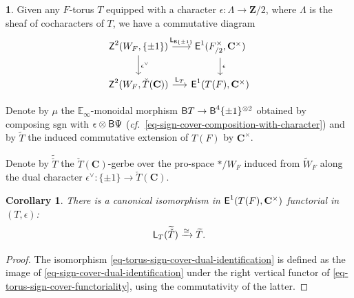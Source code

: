 \documentclass[10pt,english,reqno]{amsart}
\newcommand{\integers}{\mathbf Z}
\newcommand{\complexes}{\mathbf C}
\newcommand{\cycle}{\textnormal{\textsf{Z}}}
\newcommand{\extension}{\textnormal{\textsf{E}}}
\newcommand{\deloop}{\textnormal{\textsf{B}}}
\newcommand{\sgn}{\mathrm{sgn}}
\newcommand{\Langlands}{\textnormal{\textsf{L}}}
\newtheorem{cor}[subsubsection]{Corollary}
\theoremstyle{definition}
\numberwithin{equation}{section}
\newtheorem{untitledsubsubsection}[subsubsection]{}
\newenvironment{void}
{\begin{untitledsubsubsection}}
{\end{untitledsubsubsection}}
\begin{document}

\begin{void}
Given any $F$-torus $T$ equipped with a character $\epsilon : \Lambda \rightarrow \integers/2$, where $\Lambda$ is the sheaf of cocharacters of $T$, we have a commutative diagram
\begin{equation}
\label{eq-torus-sign-cover-functoriality}
\begin{tikzcd}[column sep = 1.5em]
	\cycle^2(W_F, \{\pm 1\}) \ar[r, "\Langlands_{\deloop\{\pm 1\}}"]\ar[d, "\epsilon^{\vee}"] & \extension^1(F^{\times}_{/2}, \complexes^{\times}) \ar[d, "\epsilon"] \\
	\cycle^2(W_F, \check T(\complexes)) \ar[r, "\Langlands_T"] & \extension^1(T(F), \complexes^{\times})
\end{tikzcd}
\end{equation}

Denote by $\mu$ the $\mathbb E_{\infty}$-monoidal morphism $\deloop T \rightarrow \deloop^4\{\pm 1\}^{\otimes 2}$ obtained by composing $\sgn$ with $\epsilon\otimes \deloop\Psi$ (\emph{cf.}~\eqref{eq-sign-cover-composition-with-character}) and by $\widetilde T$ the induced commutative extension of $T(F)$ by $\complexes^{\times}$.

Denote by $\widetilde{\check T}$ the $\check T(\complexes)$-gerbe over the pro-space $*/W_F$ induced from $\widetilde W_F$ along the dual character $\epsilon^{\vee} : \{\pm 1\} \rightarrow \check T(\complexes)$.
\end{void}


\begin{cor}
There is a canonical isomorphism in $\extension^1(T(F), \complexes^{\times})$ functorial in $(T, \epsilon)$:
\begin{equation}
\label{eq-torus-sign-cover-dual-identification}
\Langlands_T(\widetilde{\check T}) \xrightarrow{\simeq} \widetilde T.
\end{equation}
\end{cor}
\begin{proof}
The isomorphism \eqref{eq-torus-sign-cover-dual-identification} is defined as the image of \eqref{eq-sign-cover-dual-identification} under the right vertical functor of \eqref{eq-torus-sign-cover-functoriality}, using the commutativity of the latter.
\end{proof}


\iffalse
\end{document}
